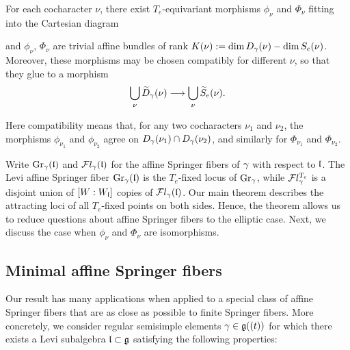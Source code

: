 \documentclass[11pt]{article}
\numberwithin{equation}{section}
\begin{document}
\begin{thm}\label{2nd main}
For each cocharacter $\nu$, there exist $T_e$-equivariant morphisms $\phi_\nu$ and
$\Phi_\nu$ fitting into the Cartesian diagram
\begin{center}
\end{center}
and $\phi_\nu$, $\Phi_\nu$ are trivial affine bundles of rank
$K(\nu):=\dim D_\gamma(\nu)-\dim S_e(\nu)$. Moreover, these morphisms may be chosen compatibly for different
$\nu$, so that they glue to a morphism
\[
\bigcup_\nu \widetilde D_\gamma(\nu)
\longrightarrow
\bigcup_\nu \widetilde S_e(\nu).
\]
\end{thm}

Here compatibility means that, for any two cocharacters $\nu_1$ and
$\nu_2$, the morphisms $\phi_{\nu_1}$ and $\phi_{\nu_2}$ agree on
$D_\gamma(\nu_1)\cap D_\gamma(\nu_2)$, and similarly for $\Phi_{\nu_1}$
and $\Phi_{\nu_2}$.

Write $\operatorname{Gr}_\gamma(\mathfrak{l})$ and $\mathcal{F}l_\gamma(\mathfrak{l})$ for the affine Springer fibers of $\gamma$ with respect to $\mathfrak{l}$. The Levi affine Springer fiber $\operatorname{Gr}_\gamma(\mathfrak{l})$ is the $T_e$-fixed locus of
$\operatorname{Gr}_\gamma$, while $\mathcal{F}l_\gamma^{T_e}$ is a disjoint union of $[W:W_{\mathfrak{l}}]$ copies of
$\mathcal{F}l_\gamma(\mathfrak{l})$. Our main theorem describes the attracting loci of all $T_e$-fixed
points on both sides. Hence, the theorem allows us to reduce questions about affine Springer fibers to the elliptic case. Next, we discuss the case when $\phi_\nu$ and $\Phi_\nu$ are isomorphisms.

\subsection{Minimal affine Springer fibers}

Our result has many applications when applied to a special class of affine Springer fibers
that are as close as possible to finite Springer fibers. More concretely, we consider regular semisimple elements 
$\gamma \in \mathfrak{g}((t))$ for which there exists a Levi subalgebra 
$\mathfrak{l} \subset \mathfrak{g}$ satisfying the following properties:
\end{document}

